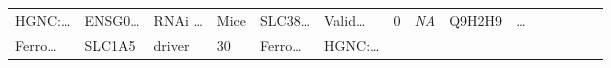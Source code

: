 \documentclass[
]{article}
\begin{document}
\begin{longtable}[]{@{}lllllllllllllll@{}}
\begin{minipage}[t]{0.05\columnwidth}
HGNC:\ldots{}\strut
\end{minipage} & \begin{minipage}[t]{0.05\columnwidth}\raggedright
ENSG0\ldots{}\strut
\end{minipage} & \begin{minipage}[t]{0.05\columnwidth}\raggedright
RNAi \ldots{}\strut
\end{minipage} & \begin{minipage}[t]{0.05\columnwidth}\raggedright
Mice\strut
\end{minipage} & \begin{minipage}[t]{0.05\columnwidth}\raggedright
SLC38\ldots{}\strut
\end{minipage} & \begin{minipage}[t]{0.05\columnwidth}\raggedright
Valid\ldots{}\strut
\end{minipage} & \begin{minipage}[t]{0.05\columnwidth}\raggedright
0\strut
\end{minipage} & \begin{minipage}[t]{0.05\columnwidth}\raggedright
\emph{NA}\strut
\end{minipage} & \begin{minipage}[t]{0.05\columnwidth}\raggedright
Q9H2H9\strut
\end{minipage} & \begin{minipage}[t]{0.02\columnwidth}\raggedright
\ldots{}\strut
\end{minipage}\tabularnewline
\begin{minipage}[t]{0.05\columnwidth}\raggedright
Ferro\ldots{}\strut
\end{minipage} & \begin{minipage}[t]{0.05\columnwidth}\raggedright
SLC1A5\strut
\end{minipage} & \begin{minipage}[t]{0.04\columnwidth}\raggedright
driver\strut
\end{minipage} & \begin{minipage}[t]{0.02\columnwidth}\raggedright
30\strut
\end{minipage} & \begin{minipage}[t]{0.05\columnwidth}\raggedright
Ferro\ldots{}\strut
\end{minipage} & \begin{minipage}[t]{0.05\columnwidth}\raggedright
HGNC:\ldots{}\strut
\end{minipage} & \begin{minipage}[t]{0.05\columnwidth}\raggedright

\end{minipage}
\end{longtable}
\end{document}

